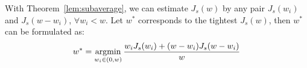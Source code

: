 

With Theorem~\ref{lem:subaverage}, we can estimate $J_s(w)$ by any pair $J_s(w_i)$ and $J_s(w-w_i)$, $\forall w_i < w$. 
Let $w^*$ corresponds to the tightest $J_s(w)$, then $w^*$ can be formulated as:
%
\begin{equation}  
\label{eq:cw_mini_1}
w^* = \operatorname*{argmin}_{w_i \in (0,w)}\frac{w_iJ_s(w_i) + (w-w_i)J_s(w-w_i) }{w}
\end{equation}


